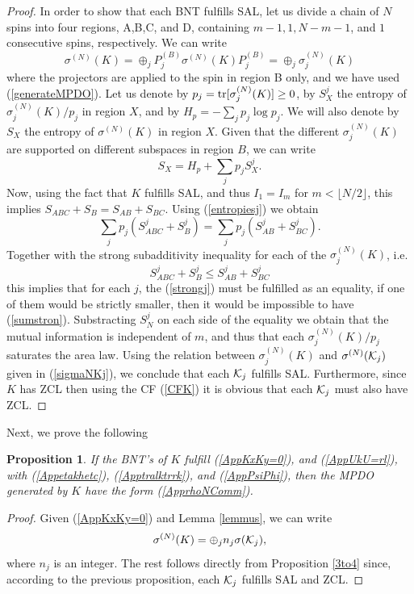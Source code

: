 \documentclass{elsarticle}
\newcommand{\be}{\begin{equation}}
\newcommand{\ee}{\end{equation}}
\newtheorem{prop}[thm]{Proposition}
\begin{document}
\begin{proof}
    In order to show that each BNT fulfills SAL, let us divide a chain of $N$ spins into four regions, A,B,C, and D, containing $m-1,1,N-m-1$, and $1$ consecutive spins, respectively. We can write
    \be
        \sigma^{(N)}(K)=\oplus_j P^{(B)}_j \sigma^{(N)}(K) P^{(B)}_j
        =\oplus_j \sigma^{(N)}_j(K)
    \ee
    where the projectors are applied to the spin in region B only, and we have used (\ref{generateMPDO}). Let us denote by $p_j={\rm tr}[\sigma^{(N)}_j(K)]\ge 0$, by $S_X^j$ the entropy of $\sigma^{(N)}_j(K)/p_j$ in region $X$, and by $H_p=-\sum_{j} p_j \log p_j$. We will also denote by $S_X$ the entropy of $\sigma^{(N)}(K)$ in region $X$. Given that the different $\sigma^{(N)}_j(K)$ are supported on different subspaces in region $B$, we can write
    \be
        \label{entropiesj}
        S_X = H_p + \sum_j p_j S_X^j.
    \ee
    Now, using the fact that $K$ fulfills SAL, and thus $I_1=I_m$ for $m<\lfloor N/2\rfloor$, this implies $S_{ABC}+S_B=S_{AB}+S_{BC}$. Using (\ref{entropiesj}) we obtain
    \be
        \label{sumstron}
        \sum_j p_j (S_{ABC}^j + S_B^j) = \sum_j p_j (S_{AB}^j + S_{BC}^j).
    \ee
    Together with the strong subadditivity inequality for each of the $\sigma^{(N)}_j(K)$, i.e.
    \be
        \label{strongj}
        S_{ABC}^j + S_B^j \le S_{AB}^j + S_{BC}^j
    \ee
    this implies that for each $j$, the (\ref{strongj}) must be fulfilled as an equality, if one of them would be strictly smaller, then it would be impossible to have (\ref{sumstron}). Substracting $S_N^j$ on each side of the equality we obtain that the mutual information is independent of $m$, and thus that each $\sigma^{(N)}_j(K)/p_j$ saturates the area law. Using the relation between $\sigma^{(N)}_j(K)$ and $\sigma^{(N)}({\cal K}_j)$ given in (\ref{sigmaNKj}), we conclude that each ${\cal K}_j$ fulfills SAL. Furthermore, since $K$ has ZCL then using the CF (\ref{CFK}) it is obvious that each ${\cal K}_j$ must also have ZCL.
\end{proof}

Next, we prove the following

\begin{prop}
    \label{prop3to4}
    If the BNT's of $K$ fulfill (\ref{AppKxKy=0}), and (\ref{AppUkU=rl}), with (\ref{Appetakhetc}), (\ref{Apptralktrrk}), and (\ref{AppPsiPhi}), then the MPDO generated by $K$ have the form (\ref{ApprhoNComm}).
\end{prop}

\begin{proof}
    Given (\ref{AppKxKy=0}) and Lemma \ref{lemmus}, we can write
    \be
        \sigma^{(N)}(K)=\oplus_j n_j \sigma({\cal K}_j),
    \ee
    where $n_j$ is an integer. The rest follows directly from Proposition \ref{3to4} since, according to the previous proposition, each ${\cal K}_j$ fulfills SAL and ZCL.
\end{proof}
\end{document}
